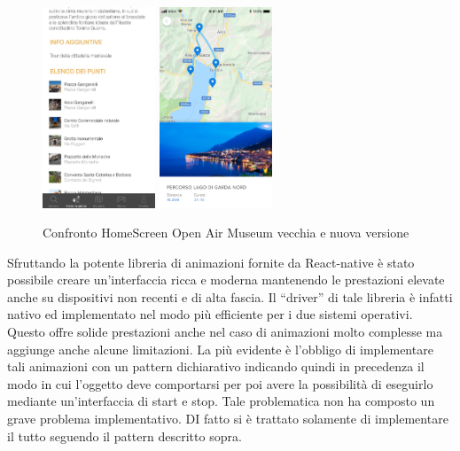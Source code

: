 \begin{figure}[h]
\centering
\includegraphics[width=0.3\textwidth]{images/listapercorsiold.jpg}
\includegraphics[width=0.3\textwidth]{images/listapercorsi.png}
\caption{Confronto HomeScreen Open Air Museum vecchia e nuova versione}
\end{figure}
\vspace{5mm}


Sfruttando la potente libreria di animazioni fornite da React-native è stato possibile creare un'interfaccia ricca e moderna mantenendo le prestazioni elevate anche su dispositivi non recenti e di alta fascia. Il “driver” di tale libreria è infatti nativo ed implementato nel modo più efficiente per i due sistemi operativi. Questo offre solide prestazioni anche nel caso di animazioni molto complesse ma aggiunge anche alcune limitazioni. La più evidente è l’obbligo di implementare tali animazioni con un pattern dichiarativo indicando quindi in precedenza il modo in cui l’oggetto deve comportarsi per poi avere la possibilità di eseguirlo mediante un'interfaccia di start e stop. Tale problematica non ha composto un grave problema implementativo. DI fatto si è trattato solamente di implementare il tutto seguendo il pattern descritto sopra.\vspace{5mm}

